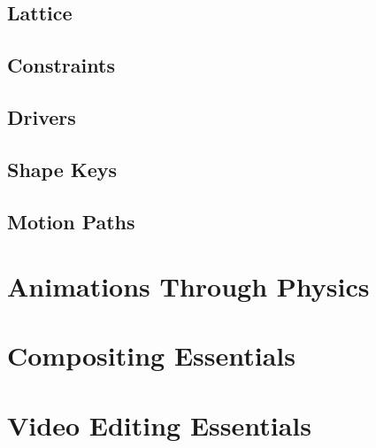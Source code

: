 \documentclass{article}
\begin{document}
\subsection{Lattice}
\subsection{Constraints}
\subsection{Drivers}
\subsection{Shape Keys}
\subsection{Motion Paths}

\section{Animations Through Physics}

\section{Compositing Essentials}

\section{Video Editing Essentials}
\end{document}
